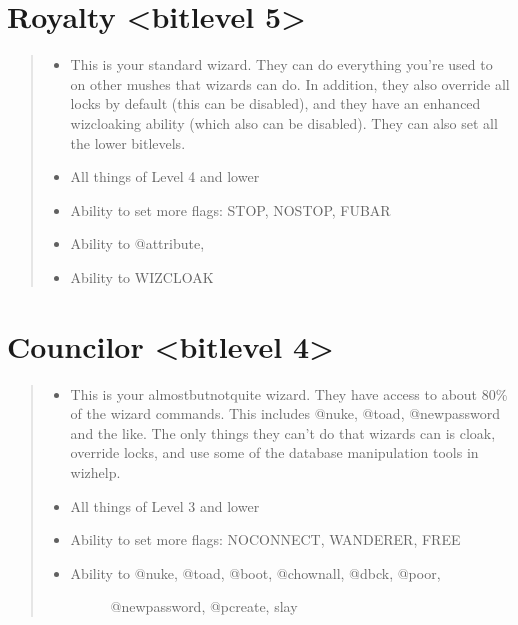 \documentclass[letterpaper,10pt,english]{sphinxmanual}
\begin{document}
\section{Royalty \textless{}bitlevel 5\textgreater{}}
\label{\detokenize{15-bitlevels:royalty-bitlevel-5}}\begin{quote}
\begin{itemize}
\item {} 
\sphinxAtStartPar
This is your standard wizard.  They can do everything you’re
used to on other mushes that wizards can do.  In addition, they
also override all locks by default (this can be disabled), and
they have an enhanced wizcloaking ability (which also can be
disabled).  They can also set all the lower bitlevels.

\end{itemize}
\begin{itemize}
\item {} 
\sphinxAtStartPar
All things of Level 4 and lower

\item {} 
\sphinxAtStartPar
Ability to set more flags: STOP, NOSTOP, FUBAR

\item {} 
\sphinxAtStartPar
Ability to @attribute,

\item {} 
\sphinxAtStartPar
Ability to WIZCLOAK

\end{itemize}
\end{quote}


\section{Councilor \textless{}bitlevel 4\textgreater{}}
\label{\detokenize{15-bitlevels:councilor-bitlevel-4}}\begin{quote}
\begin{itemize}
\item {} 
\sphinxAtStartPar
This is your almost\sphinxhyphen{}but\sphinxhyphen{}not\sphinxhyphen{}quite wizard.  They have access to
about 80\% of the wizard commands.  This includes @nuke, @toad,
@newpassword and the like.  The only things they can’t do that
wizards can is cloak, override locks, and use some of the
database manipulation tools in wizhelp.

\end{itemize}
\begin{itemize}
\item {} 
\sphinxAtStartPar
All things of Level 3 and lower

\item {} 
\sphinxAtStartPar
Ability to set more flags: NOCONNECT, WANDERER, FREE

\item {} \begin{description}
\item[{Ability to @nuke, @toad, @boot, @chownall, @dbck, @poor,}] \leavevmode
\sphinxAtStartPar
@newpassword, @pcreate, slay

\end{description}

\end{itemize}
\end{quote}
\end{document}
